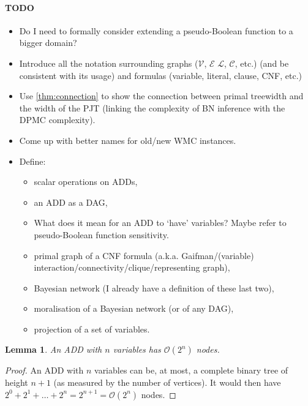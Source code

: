 \documentclass{article}
\newtheorem{lemma}{Lemma}
\theoremstyle{definition}
\theoremstyle{remark}
\begin{document}
\paragraph{TODO}
\begin{itemize}
\item Do I need to formally consider extending a pseudo-Boolean function to a
  bigger domain?
\item Introduce all the notation surrounding graphs ($\mathcal{V}$,
  $\mathcal{E}$ $\mathcal{L}$, $\mathcal{C}$, etc.) (and be consistent with its
  usage) and formulas (variable, literal, clause, CNF, etc.)
\item Use \cref{thm:connection} to show the connection between primal treewidth
  and the width of the PJT (linking the complexity of BN inference with the DPMC
  complexity).
\item Come up with better names for old/new WMC instances.
\item Define:
  \begin{itemize}
  \item scalar operations on ADDs,
  \item an ADD as a DAG,
  \item What does it mean for an ADD to `have' variables? Maybe refer to
    pseudo-Boolean function sensitivity.
  \item primal graph of a CNF formula (a.k.a.
    Gaifman/(variable) interaction/connectivity/clique/representing graph),
  \item Bayesian network (I already have a definition of these last two),
  \item moralisation of a Bayesian network (or of any DAG),
  \item projection of a set of variables.
  \end{itemize}
\end{itemize}

\begin{lemma} \label{lemma:add_size}
  An ADD with $n$ variables has $\mathcal{O}(2^n)$ nodes.
\end{lemma}
\begin{proof}
  An ADD with $n$ variables can be, at most, a complete binary tree of height
  $n+1$ (as measured by the number of vertices). It would then have $2^0 + 2^1 +
  \dots + 2^n = 2^{n+1} = \mathcal{O}(2^n)$ nodes.
\end{proof}
\end{document}
